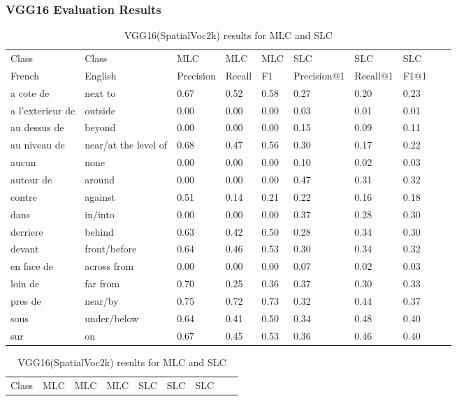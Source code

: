 \documentclass{csfyp}
\begin{document}
\subsubsection{VGG16 Evaluation Results}
\begin{table}[!htbp]
\centering
\begin{tabular}{|l|l|l|l|l|l|l|l|l|l}
\cline{1-8}
Class & Class & MLC  &  MLC  &  MLC & SLC &  SLC & SLC \\ \cline{1-8}
French & English & Precision &  Recall    & F1 & Precision@1 & Recall@1 & F1@1 \\ \cline{1-8}
a cote de	      &	next to	&	0.67	&	0.52	&	0.58	&	0.27	&	0.20	&	0.23 \\ \cline{1-8}
a l'exterieur de  &	outside	&	0.00	&	0.00	&	0.00	&	0.03	&	0.01	&	0.01 \\ \cline{1-8}
au dessus de	  &	beyond	&	0.00	&	0.00	&	0.00	&	0.15	&	0.09	&	0.11 \\ \cline{1-8}
au niveau de	  &	near/at the level of	&	0.68	&	0.47	&	0.56	&	0.30	&	0.17	&	0.22 \\ \cline{1-8}
aucun	          &	 none	&	0.00	&	0.00	&	0.00	&	0.10	&	0.02	&	0.03 \\ \cline{1-8} 
autour de	&	around	&	0.00	&	0.00	&	0.00	&	0.47	&	0.31	&	0.32 \\ \cline{1-8}
contre	&	against	&	0.51	&	0.14	&	0.21	&	0.22	&	0.16	&	0.18 \\ \cline{1-8}
dans	&	in/into	&	0.00	&	0.00	&	0.00	&	0.37	&	0.28	&	0.30 \\ \cline{1-8}
derriere	&	behind	&	0.63	&	0.42	&	0.50	&	0.28	&	0.34	&	0.30 \\ \cline{1-8}
devant	&	front/before	&	0.64	&	0.46	&	0.53	&	0.30	&	0.34	&	0.32 \\ \cline{1-8} 
en face de	&	across from	&	0.00	&	0.00	&	0.00	&	0.07	&	0.02	&	0.03 \\ \cline{1-8} 
loin de	&	far from	&	0.70	&	0.25	&	0.36	&	0.37	&	0.30	&	0.33 \\ \cline{1-8}
pres de	&	near/by	&	0.75	&	0.72	&	0.73	&	0.32	&	0.44	&	0.37 \\ \cline{1-8}
sous	&	under/below	&	0.64	&	0.41	&	0.50	&	0.34	&	0.48	&	0.40 \\ \cline{1-8}
sur	&	on	&	0.67	&	0.45	&	0.53	&	0.36	&	0.46	&	0.40 \\ \cline{1-8}
\end{tabular}
\caption{VGG16(SpatialVoc2k) results for MLC and SLC}
\centering
\begin{tabular}{|l|l|l|l|l|l|l|l|l}
\cline{1-7}
Class &  MLC  &  MLC  &  MLC & SLC &  SLC & SLC \\ \cline{1-7}

\end{tabular}
\end{table}
\end{document}
